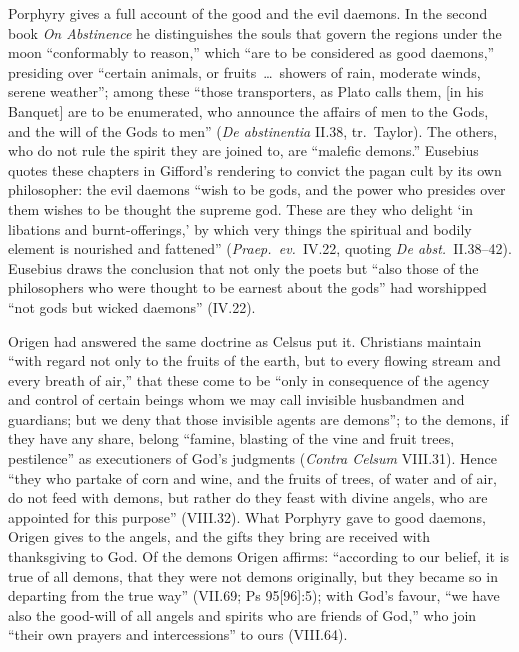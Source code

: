 Porphyry gives a full account of the good and the evil daemons. In the
second book \emph{On Abstinence} he distinguishes the souls that govern
the regions under the moon ``conformably to reason,'' which ``are to be
considered as good daemons,'' presiding over ``certain animals, or
fruits~\dots\ showers of rain, moderate winds, serene weather''; among
these ``those transporters, as Plato calls them,
[in his Banquet] are to be enumerated, who announce the affairs of men to
the Gods, and the will of the Gods to men'' (\emph{De abstinentia}
II.38, tr.\ Taylor). The others, who do not rule the spirit they are
joined to, are ``malefic demons.'' Eusebius quotes these chapters in
Gifford's rendering to convict the pagan cult by its own philosopher:
the evil daemons ``wish to be gods, and the power who presides over them
wishes to be thought the supreme god. These are they who delight `in
libations and burnt-offerings,' by which very things the spiritual and
bodily element is nourished and fattened'' (\emph{Praep.\ ev.}\ IV.22,
quoting \emph{De abst.}\ II.38--42). Eusebius draws the conclusion that
not only the poets but ``also those of the philosophers who were thought
to be earnest about the gods'' had worshipped ``not gods but wicked
daemons'' (IV.22).

Origen had answered the same doctrine as Celsus put it. Christians
maintain ``with regard not only to the fruits of the earth, but to every
flowing stream and every breath of air,'' that these come to be ``only in
consequence of the agency and control of certain beings whom we may call
invisible husbandmen and guardians; but we deny that those invisible
agents are demons''; to the demons, if they have any share, belong
``famine, blasting of the vine and fruit trees, pestilence'' as
executioners of God's judgments (\emph{Contra Celsum} VIII.31). Hence
``they who partake of corn and wine, and the fruits of trees, of water
and of air, do not feed with demons, but rather do they feast with
divine angels, who are appointed for this purpose'' (VIII.32). What
Porphyry gave to good daemons, Origen gives to the angels, and the gifts
they bring are received with thanksgiving to God. Of the demons
Origen affirms: ``according to our belief, it is true of all demons,
that they were not demons originally, but they became so in departing
from the true way'' (VII.69; Ps 95[96]:5); with God's favour, ``we
have also the good-will of all angels and spirits who are friends of
God,'' who join ``their own prayers and intercessions'' to ours
(VIII.64).


